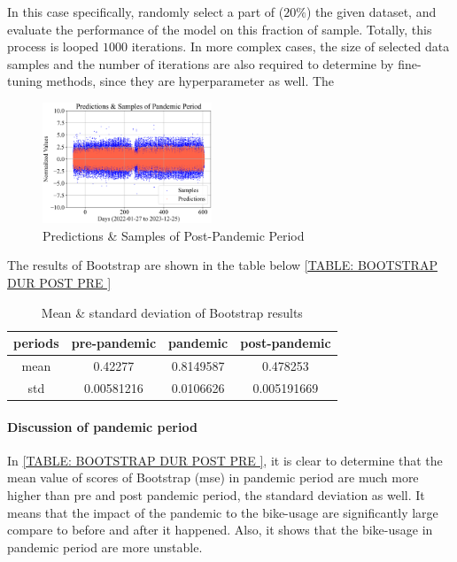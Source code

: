 In this case specifically, randomly select a part of ($20\%$) the given dataset,
and evaluate the performance of the model on this fraction of sample. 
Totally, this process is looped $1000$ iterations. 
In more complex cases, the size of selected data samples and the number of iterations
are also required to determine by fine-tuning methods, since they are hyperparameter
as well. 
The 
\begin{figure}[H]
    \centering
    \includegraphics[width=0.45\textwidth]{chap/fig6.png}
    \caption{
        \footnotesize 
            Predictions \& Samples of Post-Pandemic Period
        } %
    \label{FIGURES: Predictions Samples of POST Pandemic Period}
\end{figure}
The results of Bootstrap are shown in the table below \ref{TABLE: BOOTSTRAP DUR POST PRE } 
\begin{table}[H]
    \footnotesize
    \centering
        \caption{
            \footnotesize
            Mean \& standard deviation of Bootstrap results
        } %
    \begin{tabular}{cccc} %
        \toprule %
        periods & pre-pandemic & pandemic & post-pandemic \\ %
        \midrule %
        mean & 0.42277 & 0.8149587 & 0.478253  \\ %
        std & 0.00581216 & 0.0106626 & 0.005191669 \\ %
        \bottomrule %
    \end{tabular}
    \label{TABLE: BOOTSTRAP DUR POST PRE
    } %
\end{table}
\paragraph{Discussion of pandemic period}
In \ref{TABLE: BOOTSTRAP DUR POST PRE }, it is clear to determine 
that the mean value of scores of Bootstrap (mse) in pandemic period
are much more higher than pre and post pandemic period, the 
standard deviation as well. 
It means that the impact of the pandemic to the bike-usage are 
significantly large compare to before and after it happened.
Also, it shows that the bike-usage in pandemic period 
are more unstable.

